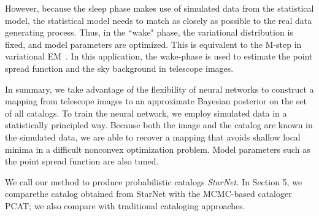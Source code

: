 However, because the sleep phase makes use of simulated data from the statistical model, the statistical model needs to match as closely as possible to the real data generating process. 
Thus, in the ``wake" phase, the variational distribution is fixed, and model parameters are optimized. 
This is equivalent to the M-step in variational EM~\cite{Jordan_intro_vi, neal2000varem, Beal2002varem}.
In this application, the wake-phase is used to estimate the point spread function and the sky background in telescope images. 

In summary, we take advantage of the flexibility of neural networks to construct a mapping from telescope images to an approximate Bayesian posterior on the set of all catalogs. To train the neural network, we employ simulated data in a statistically principled way. 
Because both the image and the catalog are known in the simulated data, we are able to recover a mapping that avoids shallow local minima in a difficult nonconvex optimization problem. 
Model parameters such as the point spread function are also tuned. 

We call our method to produce probabilistic catalogs {\itshape StarNet.}
In Section 5, we comparethe catalog obtained from StarNet with the MCMC-based cataloger PCAT;
we also compare with traditional cataloging approaches.



















